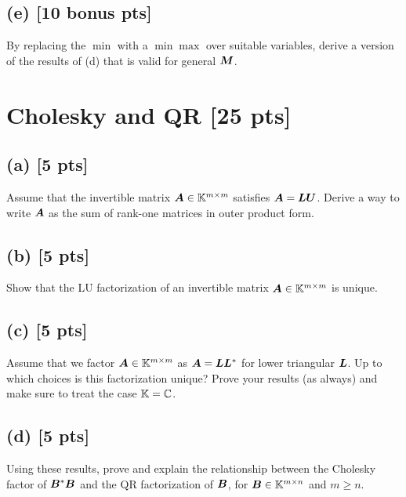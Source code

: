 \documentclass[twoside,10pt]{article}
\begin{document}
\subsection*{(e) [10 bonus pts]} 
By replacing the $\min$ with a $\min \max$ over suitable variables, derive a version of the results of (d) that is valid for general $\bm{M}$.




\section{Cholesky and QR [25 pts]}

\subsection*{(a) [5 pts]}
Assume that the invertible matrix $\bm{A} \in \mathbb{K}^{m \times m}$ satisfies $\bm{A} = \bm{L} \bm{U}$.   
Derive a way to write $\bm{A}$ as the sum of rank-one matrices in outer product form. 

\subsection*{(b) [5 pts]}
Show that the LU factorization of an invertible matrix $\bm{A} \in \mathbb{K}^{m \times m}$ is unique. 

\subsection*{(c) [5 pts]}
Assume that we factor $\bm{A} \in \mathbb{K}^{m \times m}$ as $\bm{A} = \bm{L} \bm{L}^{*}$ for lower triangular $\bm{L}$.  
Up to which choices is this factorization unique? 
Prove your results (as always) and make sure to treat the case $\mathbb{K} = \mathbb{C}$. 

\subsection*{(d) [5 pts]} 
Using these results, prove and explain the relationship between the Cholesky factor of $\bm{B}^* \bm{B}$ and the QR factorization of $\bm{B}$, for $\bm{B} \in \mathbb{K}^{m \times n}$ and $m \geq n$.
\end{document}
